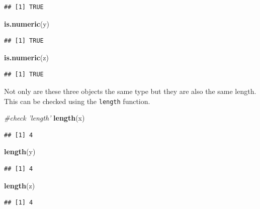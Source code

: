 \documentclass[
]{book}
\newenvironment{Shaded}{\begin{snugshade}}{\end{snugshade}}
\newcommand{\CommentTok}[1]{\textcolor[rgb]{0.56,0.35,0.01}{\textit{#1}}}
\newcommand{\KeywordTok}[1]{\textcolor[rgb]{0.13,0.29,0.53}{\textbf{#1}}}
\newcommand{\NormalTok}[1]{#1}
\theoremstyle{definition}
\theoremstyle{definition}
\theoremstyle{definition}
\theoremstyle{remark}
\begin{document}
\begin{verbatim}
## [1] TRUE
\end{verbatim}

\begin{Shaded}
\begin{Highlighting}[]
\KeywordTok{is.numeric}\NormalTok{(y)}
\end{Highlighting}
\end{Shaded}

\begin{verbatim}
## [1] TRUE
\end{verbatim}

\begin{Shaded}
\begin{Highlighting}[]
\KeywordTok{is.numeric}\NormalTok{(z)}
\end{Highlighting}
\end{Shaded}

\begin{verbatim}
## [1] TRUE
\end{verbatim}

Not only are these three objects the same type but they are also the same length. This can be checked using the \texttt{length} function.

\begin{Shaded}
\begin{Highlighting}[]
\CommentTok{#check 'length'}
\KeywordTok{length}\NormalTok{(x)}
\end{Highlighting}
\end{Shaded}

\begin{verbatim}
## [1] 4
\end{verbatim}

\begin{Shaded}
\begin{Highlighting}[]
\KeywordTok{length}\NormalTok{(y)}
\end{Highlighting}
\end{Shaded}

\begin{verbatim}
## [1] 4
\end{verbatim}

\begin{Shaded}
\begin{Highlighting}[]
\KeywordTok{length}\NormalTok{(z)}
\end{Highlighting}
\end{Shaded}

\begin{verbatim}
## [1] 4
\end{verbatim}
\end{document}
